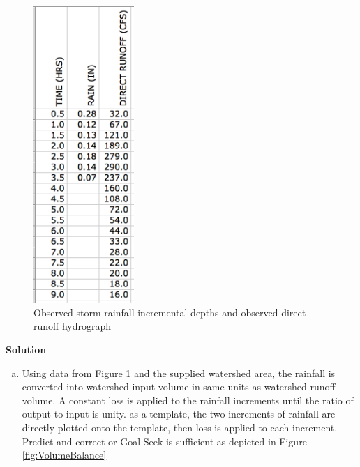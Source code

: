 \documentclass[12pt]{article}
\begin{document}
\begin{enumerate}
\begin{figure}[h!] %
   \centering
   \includegraphics[width=1.5in]{RainRunoff1.jpg} 
   \caption{Observed storm rainfall incremental depths and observed direct runoff hydrograph}
   \label{fig:RainRunoff1}
\end{figure}

\clearpage
\textbf{Solution}

\begin{enumerate}[a)]

\item Using data from Figure \ref{fig:RainRunoff1} and the supplied watershed area, the rainfall is converted into watershed input volume in same units as watershed runoff volume.  A constant loss is applied to the rainfall increments until the ratio of output to input is unity.  as a template, the two increments of rainfall are directly plotted onto the template, then loss is applied to each increment.  Predict-and-correct or Goal Seek is sufficient as depicted in Figure \ref{fig:VolumeBalance}


\end{enumerate}
\end{enumerate}
\end{document}
